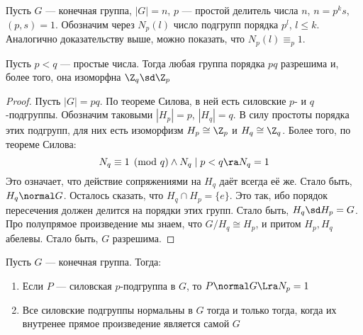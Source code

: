 \begin{note}
	Пусть $G$ --- конечная группа, $|G| = n$, $p$ --- простой делитель числа $n$, $n = p^ks$, $(p, s) = 1$. Обозначим через $N_p(l)$ число подгрупп порядка $p^l$, $l \le k$. Аналогично доказательству выше, можно показать, что $N_p(l) \equiv_p 1$.
\end{note}

\begin{proposition}
	Пусть $p < q$ --- простые числа. Тогда любая группа порядка $pq$ разрешима и, более того, она изоморфна $\Z_q \sd \Z_p$
\end{proposition}

\begin{proof}
	Пусть $|G| = pq$. По теореме Силова, в ней есть силовские $p$- и $q$-подгруппы. Обозначим таковыми $|H_p| = p$, $|H_q| = q$. В силу простоты порядка этих подгрупп, для них есть изоморфизм $H_p \cong \Z_p$ и $H_q \cong \Z_q$. Более того, по теореме Силова:
	\[
		N_q \equiv 1 \pmod q \wedge N_q \mid p < q \ra N_q = 1
	\]
	Это означает, что действие сопряжениями на $H_q$ даёт всегда её же. Стало быть, $H_q \normal G$. Осталось сказать, что $H_q \cap H_p = \{e\}$. Это так, ибо порядок пересечения должен делится на порядки этих групп. Стало быть, $H_q \sd H_p = G$. Про полупрямое произведение мы знаем, что $G / H_q \cong H_p$, и притом $H_p, H_q$ абелевы. Стало быть, $G$ разрешима.
\end{proof}

\begin{theorem} Пусть $G$ --- конечная группа. Тогда:
	\begin{enumerate}
		\item Если $P$ --- силовская $p$-подгруппа в $G$, то $P \normal G \Lra N_p = 1$
		
		\item Все силовские подгруппы нормальны в $G$ тогда и только тогда, когда их внутренее прямое произведение является самой $G$
	\end{enumerate}
\end{theorem}

